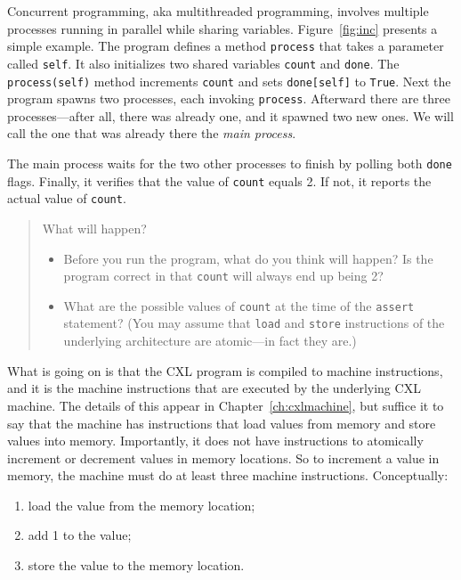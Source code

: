 \documentclass{report}
\begin{document}
Concurrent programming, aka multithreaded programming, involves multiple
processes running in parallel while sharing variables.
Figure~\ref{fig:inc} presents a simple example.  The program defines a
method \texttt{process} that takes a parameter called \texttt{self}.
It also initializes two shared variables \texttt{count} and \texttt{done}.
The \texttt{process(self)} method increments \texttt{count} and sets \texttt{done[self]}
to \texttt{True}.
Next the program spawns two processes, each invoking \texttt{process}.
Afterward there are three processes---after
all, there was already one, and it spawned two new ones.  We will call
the one that was already there the \emph{main process}.

The main process waits for the two other processes to finish by polling
both \texttt{done} flags.
Finally, it verifies that the value of \texttt{count} equals 2.  If not,
it reports the actual value of \texttt{count}.

\begin{quote}
What will happen?
\begin{itemize}
\item Before you run the program, what do you think will happen?  Is the
program correct in that \texttt{count} will always end up being 2?
\item What are the possible values of \texttt{count} at the time of the
\texttt{assert} statement?
(You may assume that \texttt{load} and \texttt{store} instructions of the
underlying architecture are atomic---in fact they are.)
\end{itemize}
\end{quote}

What is going on is that the CXL program is compiled to machine instructions,
and it is the machine instructions that are executed by the underlying CXL
machine.  The details of this appear in Chapter~\ref{ch:cxlmachine},
but suffice it to
say that the machine has instructions that load values from memory and store
values into memory.  Importantly, it does not have instructions to atomically
increment or decrement values in memory locations.
So to increment a value in memory,
the machine must do at least three machine instructions.  Conceptually:
\begin{enumerate}
\item load the value from the memory location;
\item add 1 to the value;
\item store the value to the memory location.
\end{enumerate}
\end{document}
